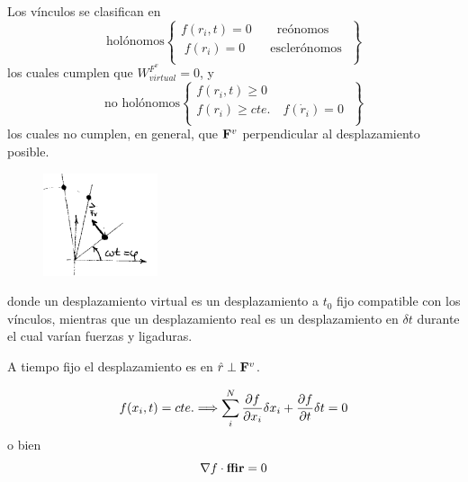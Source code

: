 \documentclass[10pt,oneside]{CBFT_book}
\begin{document}
Los vínculos se clasifican en
\[
\textrm{holónomos} 
\begin{Bmatrix}
 f(r_i,t) = 0 \qquad \textrm{reónomos} \\
\; f(r_i) = 0 \qquad \textrm{esclerónomos} \;\\
\end{Bmatrix} 
\]
los cuales cumplen que  $W_{virtual}^{F^v}=0$, y
\[
\textrm{no holónomos} 
\begin{Bmatrix}
 f(r_i,t) \geq 0  \\
 f(r_i) \geq cte. \quad f(\dot{r}_i) = 0  \; \\
\end{Bmatrix}
\]
los cuales no cumplen, en general, que $\vb{F}^v$ perpendicular al desplazamiento posible.
\begin{figure}[hbt]
	\begin{center}
	\includegraphics[width=0.3\textwidth]{images/fig_mc_vinculos3.pdf}	
	\end{center}
	\caption{}
\end{figure} 
donde un desplazamiento virtual es un desplazamiento a $t_0$ fijo compatible con los vínculos,
mientras que un desplazamiento real es un desplazamiento en $\delta t$ durante el cual varían
fuerzas y ligaduras.

A tiempo fijo el desplazamiento es en $\hat{r} \perp \vb{F}^v$.

\[
	f(x_i,t) = cte. \Longrightarrow \sum_i^N \frac{\partial^{\hspace{-0.05em}} {f}}{\partial {x_i}^{\hspace{-0.05em}}} \delta x_i + \frac{\partial^{\hspace{-0.05em}} {f}}{\partial {t}^{\hspace{-0.05em}}} \delta t = 0 
\]
o bien
\[
	\nabla f \cdot \vb{\delta r} = 0
\]


\end{document}

